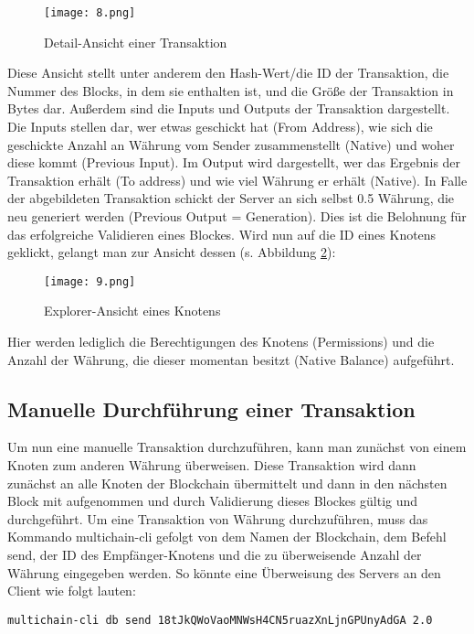 \begin{figure}[h]
	\texttt{[image: 8.png]}
	\caption{Detail-Ansicht einer Transaktion}
	\label{fig:8}
\end{figure}

Diese Ansicht stellt unter anderem den Hash-Wert/die ID der Transaktion, die Nummer des Blocks, in dem sie enthalten ist, und die Größe der Transaktion in Bytes dar. Außerdem sind die Inputs und Outputs der Transaktion dargestellt. Die Inputs stellen dar, wer etwas geschickt hat (From Address), wie sich die geschickte Anzahl an Währung vom Sender zusammenstellt (Native) und woher diese kommt (Previous Input). Im Output wird dargestellt, wer das Ergebnis der Transaktion erhält (To address) und wie viel Währung er erhält (Native). In Falle der abgebildeten Transaktion schickt der Server an sich selbst 0.5 Währung, die neu generiert werden (Previous Output = Generation). Dies ist die Belohnung für das erfolgreiche Validieren eines Blockes. Wird nun auf die ID eines Knotens geklickt, gelangt man zur Ansicht dessen (s. Abbildung \ref{fig:9}):

\begin{figure}[h]
	\texttt{[image: 9.png]}
	\caption{Explorer-Ansicht eines Knotens}
	\label{fig:9}
\end{figure}

Hier werden lediglich die Berechtigungen des Knotens (Permissions) und die Anzahl der Währung, die dieser momentan besitzt (Native Balance) aufgeführt.

\subsection{Manuelle Durchführung einer Transaktion}
Um nun eine manuelle Transaktion durchzuführen, kann man zunächst von einem Knoten zum anderen Währung überweisen. Diese Transaktion wird dann zunächst an alle Knoten der Blockchain übermittelt und dann in den nächsten Block mit aufgenommen und durch Validierung dieses Blockes gültig und durchgeführt. Um eine Transaktion von Währung durchzuführen, muss das Kommando multichain-cli gefolgt von dem Namen der Blockchain, dem Befehl send, der ID des Empfänger-Knotens und die zu überweisende Anzahl der Währung eingegeben werden. So könnte eine Überweisung des Servers an den Client wie folgt lauten:

\begin{lstlisting}[frame=single]
multichain-cli db send 18tJkQWoVaoMNWsH4CN5ruazXnLjnGPUnyAdGA 2.0
\end{lstlisting} 

